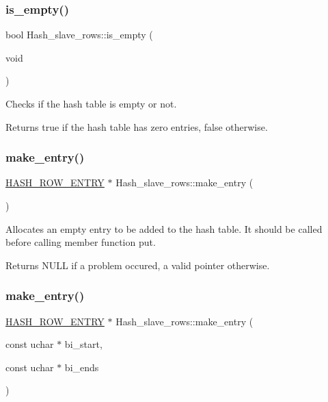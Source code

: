 \subsubsection{\texorpdfstring{is\+\_\+empty()}{is\_empty()}}
{\footnotesize\ttfamily bool Hash\+\_\+slave\+\_\+rows\+::is\+\_\+empty (\begin{DoxyParamCaption}\item[{void}]{ }\end{DoxyParamCaption})}

Checks if the hash table is empty or not.

\begin{DoxyReturn}{Returns}
true if the hash table has zero entries, false otherwise. 
\end{DoxyReturn}
\mbox{\label{classHash__slave__rows_a5f6d6cf9561e924b1bb3585385a91d3a}} 
\subsubsection{\texorpdfstring{make\+\_\+entry()}{make\_entry()}\hspace{0.1cm}{\footnotesize\ttfamily [1/2]}}
{\footnotesize\ttfamily \mbox{\hyperlink{structhash__row__entry__st}{H\+A\+S\+H\+\_\+\+R\+O\+W\+\_\+\+E\+N\+T\+RY}} $\ast$ Hash\+\_\+slave\+\_\+rows\+::make\+\_\+entry (\begin{DoxyParamCaption}{ }\end{DoxyParamCaption})}

Allocates an empty entry to be added to the hash table. It should be called before calling member function {\ttfamily put}.

\begin{DoxyReturn}{Returns}
N\+U\+LL if a problem occured, a valid pointer otherwise. 
\end{DoxyReturn}
\mbox{\label{classHash__slave__rows_ae184c4d7ba20c3529c18362503d3cc81}} 
\subsubsection{\texorpdfstring{make\+\_\+entry()}{make\_entry()}\hspace{0.1cm}{\footnotesize\ttfamily [2/2]}}
{\footnotesize\ttfamily \mbox{\hyperlink{structhash__row__entry__st}{H\+A\+S\+H\+\_\+\+R\+O\+W\+\_\+\+E\+N\+T\+RY}} $\ast$ Hash\+\_\+slave\+\_\+rows\+::make\+\_\+entry (\begin{DoxyParamCaption}\item[{const uchar $\ast$}]{bi\+\_\+start,  }\item[{const uchar $\ast$}]{bi\+\_\+ends }\end{DoxyParamCaption})}

